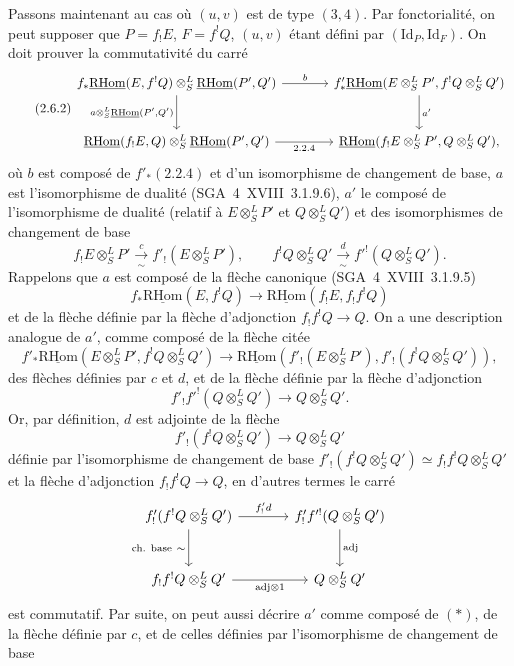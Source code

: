 \documentclass[11pt]{article}
\newcommand{\R}{\mathrm{R}}\newcommand{\RHomCore}{\mathrm{RHom}}
\providecommand{\RHom}{\RHomCore}
\providecommand{\uRHom}{\underline{\RHom}}
\providecommand{\Id}{\mathrm{Id}}
\providecommand{\RHom}{\RHomCore}
\providecommand{\RHom}{\R\mathcal{H}om}
\providecommand{\R}{\mathrm R}
\providecommand{\RHom}{\RHomCore}
\begin{document}
Passons maintenant au cas où $(u,v)$ est de type $(3,4)$. Par fonctorialité, on peut supposer que $P=f_{!}E$, $F=f^{!}Q$, $(u,v)$ étant défini par $(\Id_P,\Id_F)$. On doit prouver la commutativité du carré
\begin{equation}\tag{2.6.2}
\begin{tikzcd}[column sep=large,row sep=large]
f_*\uRHom(E,f^!Q)\otimes^L_S\uRHom(P',Q') \arrow[r,"b"] \arrow[d,"{a\otimes^L_S\uRHom(P',Q')}"'] & f'_*\uRHom(E\otimes^L_SP',f^!Q\otimes^L_SQ') \arrow[d,"a'"]\\
\uRHom(f_!E,Q)\otimes^L_S\uRHom(P',Q') \arrow[r,"2.2.4"'] & \uRHom(f_!E\otimes^L_SP',Q\otimes^L_SQ'),
\end{tikzcd}
\end{equation}
où $b$ est composé de $f'_*(2.2.4)$ et d'un isomorphisme de changement de base, $a$ est l'isomorphisme de dualité (SGA~4~XVIII~3.1.9.6), $a'$ le composé de l'isomorphisme de dualité (relatif à $E\otimes^L_SP'$ et $Q\otimes^L_SQ'$) et des isomorphismes de changement de base
\[
f_!E\otimes^L_SP'\xrightarrow[\sim]{c}f'_!(E\otimes^L_SP'),
\qquad
f^!Q\otimes^L_SQ'\xrightarrow[\sim]{d}f'^!(Q\otimes^L_SQ').
\]
Rappelons que $a$ est composé de la flèche canonique (SGA~4~XVIII~3.1.9.5)
\[
f_*\uRHom(E,f^!Q)\longrightarrow\uRHom(f_!E,f_!f^!Q)
\]
et de la flèche définie par la flèche d'adjonction $f_!f^!Q\to Q$. On a une description analogue de $a'$, comme composé de la flèche citée
\begin{equation}\tag{*}
f'_*\uRHom(E\otimes^L_SP',f^!Q\otimes^L_SQ')\longrightarrow
\uRHom(f'_!(E\otimes^L_SP'),f'_!(f^!Q\otimes^L_SQ')),
\end{equation}
des flèches définies par $c$ et $d$, et de la flèche définie par la flèche d'adjonction
\[
f'_!f'^!(Q\otimes^L_SQ')\longrightarrow Q\otimes^L_SQ'.
\]
Or, par définition, $d$ est adjointe de la flèche
\[
f'_!(f^!Q\otimes^L_SQ')\longrightarrow Q\otimes^L_SQ'
\]
définie par l'isomorphisme de changement de base $f'_!(f^!Q\otimes^L_SQ')\simeq f_!f^!Q\otimes^L_SQ'$ et la flèche d'adjonction $f_!f^!Q\to Q$, en d'autres termes le carré
\[
\begin{tikzcd}[column sep=large,row sep=large]
f'_!(f^!Q\otimes^L_SQ') \arrow[r,"{f'_!d}"] \arrow[d,"{\text{ch. base}\ \sim}"'] & f'_!f'^!(Q\otimes^L_SQ') \arrow[d,"\mathrm{adj}"]\\
f_!f^!Q\otimes^L_SQ' \arrow[r,"{\mathrm{adj}\otimes 1}"'] & Q\otimes^L_SQ'
\end{tikzcd}
\]
est commutatif. Par suite, on peut aussi décrire $a'$ comme composé de $(*)$, de la flèche définie par $c$, et de celles définies par l'isomorphisme de changement de base
\end{document}
